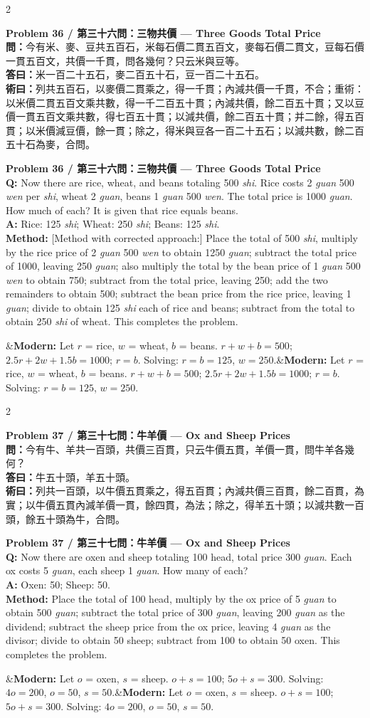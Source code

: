 \documentclass[11pt,a4paper]{article}
\newcommand{\bilingualproblem}[4]{%
  \begin{paracol}{2}
  \begin{leftcolumn}
  \noindent\textbf{\color{problemcolor}#1}\\[0.2cm]
  #2
  \end{leftcolumn}
  \switchcolumn
  \noindent\textbf{\color{problemcolor}#1}\\[0.2cm]
  #3
  \end{paracol}
  \ifx&#4&\else\vspace{0.3cm}\noindent#4\fi
  \vspace{0.5cm}
}
\newcommand{\wen}[1]{\textcolor{problemcolor}{\textbf{問：}}#1}
\newcommand{\da}[1]{\textcolor{answercolor}{\textbf{答曰：}}#1}
\newcommand{\shu}[1]{\textcolor{methodcolor}{\textbf{術曰：}}#1}
\newcommand{\wenen}[1]{\textcolor{problemcolor}{\textbf{Q:}} #1}
\newcommand{\daen}[1]{\textcolor{answercolor}{\textbf{A:}} #1}
\newcommand{\shuen}[1]{\textcolor{methodcolor}{\textbf{Method:}} #1}
\begin{document}
\bilingualproblem{Problem 36 / 第三十六問：三物共價 --- Three Goods Total Price}{
\wen{今有米、麥、豆共五百石，米每石價二貫五百文，麥每石價二貫文，豆每石價一貫五百文，共價一千貫，問各幾何？只云米與豆等。}\\[0.2cm]
\da{米一百二十五石，麥二百五十石，豆一百二十五石。}\\[0.2cm]
\shu{列共五百石，以麥價二貫乘之，得一千貫；內減共價一千貫，不合；重術：以米價二貫五百文乘共數，得一千二百五十貫；內減共價，餘二百五十貫；又以豆價一貫五百文乘共數，得七百五十貫；以減共價，餘二百五十貫；并二餘，得五百貫；以米價減豆價，餘一貫；除之，得米與豆各一百二十五石；以減共數，餘二百五十石為麥，合問。}
}{
\wenen{Now there are rice, wheat, and beans totaling 500 \textit{shi}. Rice costs 2 \textit{guan} 500 \textit{wen} per \textit{shi}, wheat 2 \textit{guan}, beans 1 \textit{guan} 500 \textit{wen}. The total price is 1000 \textit{guan}. How much of each? It is given that rice equals beans.}\\[0.2cm]
\daen{Rice: 125 \textit{shi}; Wheat: 250 \textit{shi}; Beans: 125 \textit{shi}.}\\[0.2cm]
\shuen{[Method with corrected approach:] Place the total of 500 \textit{shi}, multiply by the rice price of 2 \textit{guan} 500 \textit{wen} to obtain 1250 \textit{guan}; subtract the total price of 1000, leaving 250 \textit{guan}; also multiply the total by the bean price of 1 \textit{guan} 500 \textit{wen} to obtain 750; subtract from the total price, leaving 250; add the two remainders to obtain 500; subtract the bean price from the rice price, leaving 1 \textit{guan}; divide to obtain 125 \textit{shi} each of rice and beans; subtract from the total to obtain 250 \textit{shi} of wheat. This completes the problem.}
}{\textbf{Modern:} Let $r$ = rice, $w$ = wheat, $b$ = beans. $r + w + b = 500$; $2.5r + 2w + 1.5b = 1000$; $r = b$. Solving: $r = b = 125$, $w = 250$.}

\bilingualproblem{Problem 37 / 第三十七問：牛羊價 --- Ox and Sheep Prices}{
\wen{今有牛、羊共一百頭，共價三百貫，只云牛價五貫，羊價一貫，問牛羊各幾何？}\\[0.2cm]
\da{牛五十頭，羊五十頭。}\\[0.2cm]
\shu{列共一百頭，以牛價五貫乘之，得五百貫；內減共價三百貫，餘二百貫，為實；以牛價五貫內減羊價一貫，餘四貫，為法；除之，得羊五十頭；以減共數一百頭，餘五十頭為牛，合問。}
}{
\wenen{Now there are oxen and sheep totaling 100 head, total price 300 \textit{guan}. Each ox costs 5 \textit{guan}, each sheep 1 \textit{guan}. How many of each?}\\[0.2cm]
\daen{Oxen: 50; Sheep: 50.}\\[0.2cm]
\shuen{Place the total of 100 head, multiply by the ox price of 5 \textit{guan} to obtain 500 \textit{guan}; subtract the total price of 300 \textit{guan}, leaving 200 \textit{guan} as the dividend; subtract the sheep price from the ox price, leaving 4 \textit{guan} as the divisor; divide to obtain 50 sheep; subtract from 100 to obtain 50 oxen. This completes the problem.}
}{\textbf{Modern:} Let $o$ = oxen, $s$ = sheep. $o + s = 100$; $5o + s = 300$. Solving: $4o = 200$, $o = 50$, $s = 50$.}
\end{document}
